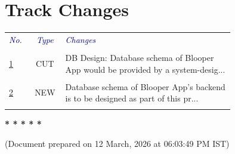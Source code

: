 \documentclass{article}%
\makeatletter
\newcommand{\tinytosmall}{%
  \fontsize
    {\fpeval{(\f@size@tiny+\f@size@small)/2}}
    {\fpeval{(\f@baselineskip@tiny+\f@baselineskip@small)/2}}%
  \selectfont
}
\makeatother
\begin{document}
\section{Track Changes}%
\label{sec:TrackChanges}%
\begin{center}\vspace{-0.5cm}%
\begin{longtable}{l c p{0.75\linewidth}}%
\arrayrulecolor{fpcblue2}%
\hline%
\rowcolor{fpcblue1}%
\textcolor{darkblue}%
                {\tinytosmall{\textit{No.}}}&\textcolor{darkblue}%
                {\tinytosmall{\textit{Type}}}&\textcolor{darkblue}%
                {\tinytosmall{\textit{Changes}}}\\%
\arrayrulecolor{fpcblue2}%
\hline%
\endhead%
\arrayrulecolor{fpcblue2}%
\hline%
\multicolumn{3}{r}{\faEllipsisH \xspace \faArrowRight}\\%
\arrayrulecolor{fpcblue2}%
\hline%
\endfoot%
\arrayrulecolor{fpcblue2}%
\hline%
\endlastfoot%
\hypertarget{CSREF:0}{}%
\tinytosmall{\hyperlink{ID:1419630603}{1}}&\textcolor{red!80!gray}%
{\tiny{\faCut\xspace CUT}}&\tinytosmall{DB Design: Database schema of Blooper App would be provided by a system{-}desig...}\\%
\hypertarget{CSREF:1}{}%
\tinytosmall{\hyperlink{ID:121203189}{2}}&\textcolor{cobalt}%
{\tiny{\faPlus\xspace NEW}}&\tinytosmall{Database schema of Blooper App's backend is to be designed as part of this pr...}\\%
\end{longtable}%
\end{center}

%
\begin{center}%
\vspace*{.5cm}%
\begin{large}%
\textbf{* * * * *}%
\end{large}%

%
\tiny{(Document prepared on 12 March, 2026 at 06:03:49 PM IST)}%
\end{center}%
\end{document}
